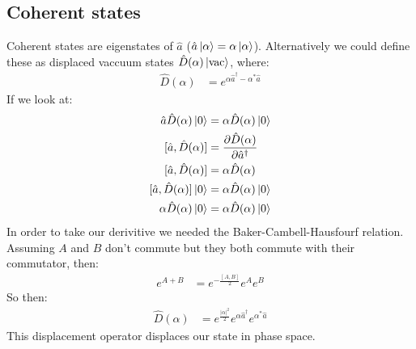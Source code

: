 \subsection{Coherent states}
Coherent states are eigenstates of $\hat{a}$ ($\hat{a}\ket{\alpha} = \alpha\ket{\alpha}$). Alternatively we could define these as displaced vaccuum states $\hat{D}(\alpha)\ket{\text{vac}}$, where:
\begin{align*}
	\hat{D}(\alpha) &= e^{\alpha\hat{a}^\dagger - \alpha^*\hat{a}}
\end{align*}
If we look at:
\begin{align*}
	\hat{a}\hat{D}(\alpha)\ket{0} &= \alpha\hat{D}(\alpha)\ket{0} \\
	[\hat{a},\hat{D}(\alpha)] &= \frac{\partial \hat{D}(\alpha)}{\partial \hat{a}^\dagger} \\
	[\hat{a},\hat{D}(\alpha)] &= \alpha \hat{D}(\alpha) \\
	[\hat{a},\hat{D}(\alpha)]\ket{0} &= \alpha\hat{D}(\alpha)\ket{0} \\
	\alpha\hat{D}(\alpha)\ket{0} &= \alpha\hat{D}(\alpha)\ket{0} \\
\end{align*}
In order to take our derivitive we needed the Baker-Cambell-Hausfourf relation. Assuming $A$ and $B$ don't commute but they both commute with their commutator, then:
\begin{align*}
	e^{A+B} &= e^{-\frac{[A,B]}{2}} e^A e^B
\end{align*}
So then:
\begin{align*}
	\hat{D}(\alpha) &= e^\frac{|\alpha|^2}{2} e^{\alpha\hat{a}^\dagger} e^{\alpha^*\hat{a}}
\end{align*}
This displacement operator displaces our state in phase space.

